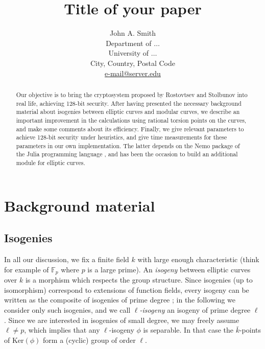 \documentclass[12pt]{article}
\newcommand{\F}{\mathbb{F}}
\begin{document}
\title{Title of your paper}

\author{John A. Smith \\
Department of $\ldots$ \\
University of $\ldots$ \\
City, Country, Postal Code \\
\url{e-mail@server.edu}}

\date{}

\maketitle

\begin{abstract}
Our objective is to bring the cryptosystem proposed by Rostovtsev and Stolbunov \cite{RS} into real life, achieving 128-bit security. After having presented the necessary background material about isogenies between elliptic curves and modular curves, we describe an important improvement in the calculations using rational torsion points on the curves, and make some comments about its efficiency. Finally, we give relevant parameters to achieve 128-bit security under heuristics, and give time measurements for these parameters in our own implementation. The latter depends on the Nemo package of the Julia programming language \cite{Nemo}, and has been the occasion to build an additional module for elliptic curves.
\end{abstract}

\section{Background material}

\subsection{Isogenies} In all our discussion, we fix a finite field $k$ with large enough characteristic (think for example of $\F_p$ where $p$ is a large prime). An \emph{isogeny} between elliptic curves over $k$ is a morphism which respects the group structure. Since isogenies (up to isomorphism) correspond to extensions of function fields, every isogeny can be written as the composite of isogenies of prime degree ; in the following we consider only such isogenies, and we call \emph{$\ell$-isogeny} an isogeny of prime degree $\ell$. Since we are interested in isogenies of small degree, we may freely assume $\ell\neq p$, which implies that any $\ell$-isogeny $\phi$ is separable. In that case the $\bar{k}$-points of Ker$(\phi)$ form a (cyclic) group of order $\ell$.
\end{document}

